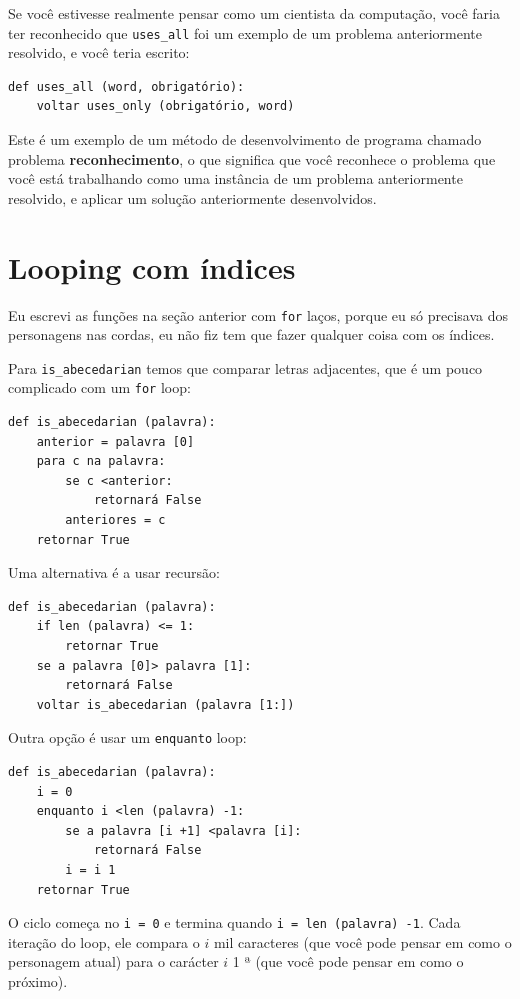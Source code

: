 \documentclass[10pt]{book}
\begin{document}
Se você estivesse realmente pensar como um cientista da computação, você faria
ter reconhecido que \verb "uses_all" foi um exemplo de um
problema anteriormente resolvido, e você teria escrito:

\begin{verbatim}
def uses_all (word, obrigatório):
    voltar uses_only (obrigatório, word)
\end{verbatim}
%
Este é um exemplo de um método de desenvolvimento de programa chamado problema {\bf
reconhecimento}, o que significa que você reconhece o problema que você está
trabalhando como uma instância de um problema anteriormente resolvido, e aplicar um
solução anteriormente desenvolvidos.


\section{Looping com índices}

Eu escrevi as funções na seção anterior com {\tt for}
laços, porque eu só precisava dos personagens nas cordas, eu não fiz
tem que fazer qualquer coisa com os índices.

Para \verb "is_abecedarian" temos que comparar letras adjacentes,
que é um pouco complicado com um {\tt for} loop:

\begin{verbatim}
def is_abecedarian (palavra):
    anterior = palavra [0]
    para c na palavra:
        se c <anterior:
            retornará False
        anteriores = c
    retornar True
\end{verbatim}


Uma alternativa é a
usar recursão:

\begin{verbatim}
def is_abecedarian (palavra):
    if len (palavra) <= 1:
        retornar True
    se a palavra [0]> palavra [1]:
        retornará False
    voltar is_abecedarian (palavra [1:])
\end{verbatim}

Outra opção é usar um {\tt enquanto} loop:

\begin{verbatim}
def is_abecedarian (palavra):
    i = 0
    enquanto i <len (palavra) -1:
        se a palavra [i +1] <palavra [i]:
            retornará False
        i = i 1
    retornar True
\end{verbatim}
%
O ciclo começa no {\tt i = 0} e termina quando {\tt i = len (palavra) -1}. Cada
iteração do loop, ele compara o $ i $ mil caracteres (que você pode
pensar em como o personagem atual) para o carácter $ i $ 1 ª (que você
pode pensar em como o próximo).
\end{document}
